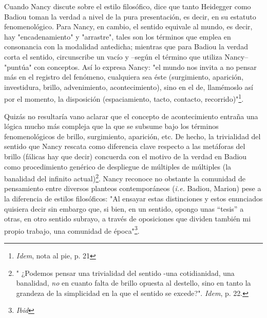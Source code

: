 Cuando Nancy discute sobre el estilo filosófico, dice que tanto
Heidegger como Badiou toman la verdad a nivel de la pura presentación,
es decir, en su estatuto fenomenológico. Para Nancy, en cambio, el
sentido equivale al mundo, es decir, hay "encadenamiento" y "arrastre",
tales son los términos que emplea en consonancia con la modalidad
antedicha; mientras que para Badiou la verdad corta el sentido,
circunscribe un vacío y --según el término que utiliza Nancy-- "puntúa"
con conceptos. Así lo expresa Nancy: "el mundo nos invita a no pensar
más en el registro del fenómeno, cualquiera sea éste (surgimiento,
aparición, investidura, brillo, advenimiento, acontecimiento), sino en
el de, llamémoslo así por el momento, la disposición (espaciamiento,
tacto, contacto, recorrido)"\footnote{\emph{Idem}, nota al pie, p. 21}.

Quizás no resultaría vano aclarar que el concepto de acontecimiento
entraña una lógica mucho más compleja que la que se subsume bajo los
términos fenomenológicos de brillo, surgimiento, aparición, etc. De
hecho, la trivialidad del sentido que Nancy rescata como diferencia
clave respecto a las metáforas del brillo (fálicas hay que decir)
concuerda con el motivo de la verdad en Badiou como procedimiento
genérico de despliegue de múltiples de múltiples (la banalidad del
infinito actual)\footnote{" ¿Podemos pensar una trivialidad del sentido
  -una cotidianidad, una banalidad, \emph{no} en cuanto falta de brillo
  opuesta al destello, sino en tanto la grandeza de la simplicidad en la
  que el sentido se excede?". \emph{Idem}, p. 22.}. Nancy reconoce no
obstante la comunidad de pensamiento entre diversos planteos
contemporáneos (\emph{i.e.} Badiou, Marion) pese a la diferencia de
estilos filosóficos: "Al ensayar estas distinciones y estos enunciados
quisiera decir sin embargo que, si bien, en un sentido, opongo unas
``tesis'' a otras, en otro sentido subrayo, a través de oposiciones que
dividen también mi propio trabajo, una comunidad de época"\footnote{\emph{Ibid}}.

